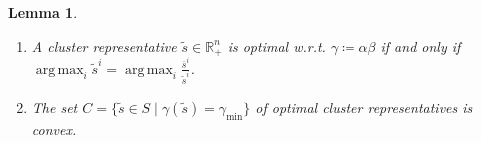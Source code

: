 \documentclass{article}
\newtheorem{lemma}[theorem]{Lemma}
\DeclareMathOperator*{\argmax}{arg\,max}
\begin{document}
\begin{lemma}\label{App:representatives}
	\begin{enumerate}
		\item A cluster representative $\tilde{s} \in \mathbb{R}^n_+$ is optimal w.r.t. $\gamma \coloneqq \alpha \beta$ if and only if $\argmax_i \tilde{s}^i = \argmax_i \frac{\overline{s}^i}{\tilde{s}^i}$.
		\item The set $C=\{\tilde{s} \in S \; \vert \; \gamma(\tilde{s}) = \gamma_{\min} \}$ of optimal cluster representatives is convex.

		\end{enumerate}
\end{lemma}
\end{document}
